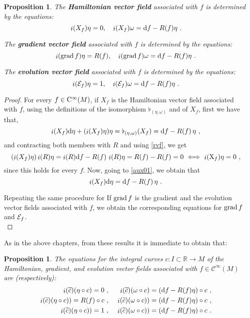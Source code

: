 \documentclass[12pt]{report}
\newtheorem{prop}[teor]{Proposition}
\def\beq{\begin{equation}}
\def\eeq{\end{equation}}
\def\bea{\begin{eqnarray}}
\def\eea{\end{eqnarray}}
\def\qed{\ifvmode\removelastskip\fi
{\unskip\nobreak\hfil\penalty50\hbox{}\nobreak\hfil
\hbox{\vrule height1.2ex width1.2ex}\parfillskip=0pt
\finalhyphendemerits=0 \par\smallskip}}
\def\d{{\rm d}}
\def\Real{\mathbb{R}}
\def\X{{\rm X}}
\def\inn{\mathop{i}\nolimits}
\def\Cinfty{{\rm C}^\infty}
\begin{document}
\begin{prop}
The \textbf{Hamiltonian vector field} associated with $f$
is determined by the equations:
\beq
\inn(X_f)\eta=0 ,\quad \inn(X_f)\omega=\d f-R(f)\eta\ .
\label{Havf}
\eeq

The \textbf{gradient vector field} associated with $f$ is determined by the equations:
\beq
 \inn({{\rm grad}\, f})\eta = R(f) ,\quad 
\inn({{\rm grad}\, f})\omega=\d f-R(f)\eta\ .
\label{gravf}
\eeq

The \textbf{evolution vector field}  associated with $f$
is determined by the equations:
\beq
\inn({\cal E}_f)\eta=1 ,\quad
\inn({\cal E}_f)\omega = \d f- R(f)\eta\ .
\label{evovf}
\eeq
\end{prop}
\begin{proof}
For every $f\in\Cinfty(M)$,
if  $X_f$ is the Hamiltonian vector field associated with $f$,
using the definitions of the isomorphism $\flat_{(\eta,\omega)}$ and of $X_f$, first we have that,
\beq
\label{aux01}
\inn(X_f)\d\eta+(\inn(X_f)\eta)\eta=
\flat_{(\eta,\omega)}(X_f)=\d f-R(f)\,\eta \ ,
\eeq
and contracting both members with $R$ and using \eqref{rvf}, we get
$$
(\inn(X_f)\eta)\inn(R)\eta=
\inn(R)\d f-R(f)\,\inn(R)\eta=
R(f)-R(f)=0
\ \Longleftrightarrow\ \inn(\X_f)\eta=0 \ ,
$$
since this holds for every $f$.
Now, going to \eqref{aux01}, we obtain that
$$
\inn(X_f)\d\eta=\d f-R(f)\,\eta \ .
$$

Repeating the same procedure for 
If ${\rm grad}\,f$ is the gradient and the evolution vector fields associated with $f$,
we obtain the corresponding equations for 
${\rm grad}\,f$ and ${\cal E}_f$.
\\ \qed \end{proof}

As in the above chapters, from these results it is immediate to obtain that:

\begin{prop}
The equations for the integral curves $c\colon I\subset\Real\to M$
of the Hamiltonian, gradient, and evolution vector fields associated with
$f\in\mathcal{C}^\infty(M)$ are (respectively):
\bea
\inn(\widetilde{c})(\eta\circ c)=0 \ & ,& \ 
\inn(\widetilde{c})(\omega\circ c)=(\d f-R(f)\eta)\circ c\ , \nonumber \\
 \inn(\widetilde{c})(\eta\circ c)) = R(f)\circ c \ & , &\
\inn(\widetilde{c})(\omega\circ c))=(\d f-R(f)\eta)\circ c\ , \nonumber \\
\inn(\widetilde{c})(\eta\circ c))=1 \ & ,& \
\inn(\widetilde{c})(\omega\circ c)) = (\d f- R(f)\eta)\circ c\ .
\label{evoic}
\eea
\end{prop}
\end{document}
